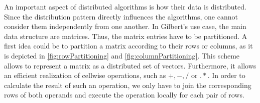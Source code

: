 An important aspect of distributed algorithms is how their data is distributed. 
Since the distribution pattern directly influences the algorithms, one cannot consider them independently from one another. 
In Gilbert's use case, the main data structure are matrices. 
Thus, the matrix entries have to be partitioned.
A first idea could be to partition a matrix according to their rows or columns, as it is depicted in \cref{fig:rowPartitioning} and \cref{fig:columnPartitioning}. 
This scheme allows to represent a matrix as a distributed set of vectors.
Furthermore, it allows an efficient realization of cellwise operations, such as $+,-,/$ or $.*$. 
In order to calculate the result of such an operation, we only have to join the corresponding rows of both operands and execute the operation locally for each pair of rows.

